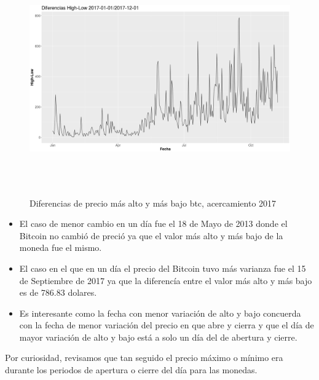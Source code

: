 \documentclass[12pt,letterpaper]{article}
\begin{document}
    \begin{figure}
        \centering

        \includegraphics[width = 18cm, height = 10cm]{btc/diferencias_BTC_HighLow_2}

        \caption{Diferencias de precio m\'as alto y m\'as bajo btc, acercamiento 2017}
    \end{figure}


    \begin{itemize}

        \item El caso de menor cambio en un d\'ia fue el 18 de Mayo de 2013 donde el Bitcoin no cambi\'o de preci\'o ya que el valor m\'as alto y m\'as bajo de la moneda fue el mismo.

        \item El caso en el que en un d\'ia el precio del Bitcoin tuvo m\'as varianza fue el 15 de Septiembre de 2017 ya que la diferenc\'ia entre el valor m\'as alto y m\'as bajo es de 786.83 dolares.

        \item Es interesante como la fecha con menor variaci\'on de alto y bajo concuerda con la fecha de menor variaci\'on del precio en que abre y cierra y que el d\'ia de mayor variaci\'on de alto y bajo est\'a a solo un d\'ia del de abertura y cierre.

    \end{itemize}



    Por curiosidad, revisamos que tan seguido el precio máximo o mínimo era durante los periodos de apertura o cierre del día para las monedas.
\end{document}
